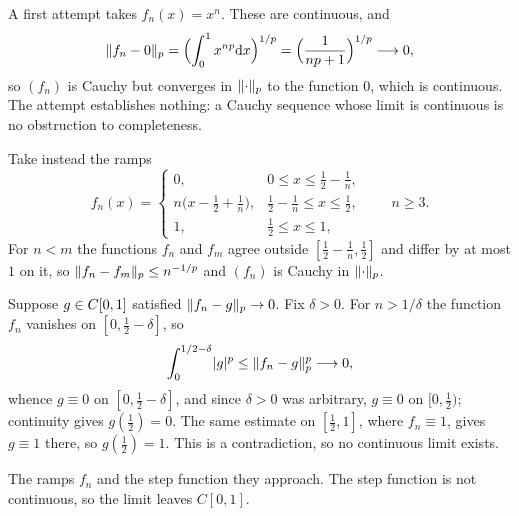 \begin{solution}[Discussion]
A first attempt takes $f_n(x) = x^n$. These are continuous, and
\[
  \lVert f_n - 0\rVert_p = \Bigl(\int_0^1 x^{np} \mathrm{d} x\Bigr)^{1/p}
  = \Bigl(\frac{1}{np+1}\Bigr)^{1/p} \longrightarrow 0 ,
\]
so $(f_n)$ is Cauchy but converges in $\lVert\cdot\rVert_p$ to the function $0$,
which is continuous. The attempt establishes nothing: a Cauchy sequence whose
limit is continuous is no obstruction to completeness.

Take instead the ramps
\[
  f_n(x) =
  \begin{cases}
    0, & 0 \le x \le \tfrac{1}{2} - \tfrac{1}{n}, \\[2pt]
    n\bigl(x - \tfrac{1}{2} + \tfrac{1}{n}\bigr),
      & \tfrac{1}{2} - \tfrac{1}{n} \le x \le \tfrac{1}{2}, \\[2pt]
    1, & \tfrac{1}{2} \le x \le 1,
  \end{cases}
  \qquad n \ge 3 .
\]
For $n < m$ the functions $f_n$ and $f_m$ agree outside
$[\frac{1}{2} - \frac{1}{n}, \frac{1}{2}]$ and differ by at most $1$ on it, so
$\lVert f_n - f_m\rVert_p \le n^{-1/p}$ and $(f_n)$ is Cauchy in
$\lVert\cdot\rVert_p$.

Suppose $g \in C[0,1]$ satisfied $\lVert f_n - g\rVert_p \to 0$. Fix
$\delta > 0$. For $n > 1/\delta$ the function $f_n$ vanishes on
$[0, \frac{1}{2} - \delta]$, so
\[
  \int_0^{1/2-\delta} \lvert g\rvert^p \le \lVert f_n - g\rVert_p^p \longrightarrow 0,
\]
whence $g \equiv 0$ on $[0, \frac{1}{2} - \delta]$, and since $\delta > 0$ was
arbitrary, $g \equiv 0$ on $[0, \frac{1}{2})$; continuity gives
$g(\frac{1}{2}) = 0$. The same estimate on $[\frac{1}{2}, 1]$, where
$f_n \equiv 1$, gives $g \equiv 1$ there, so $g(\frac{1}{2}) = 1$. This is a
contradiction, so no continuous limit exists.
\end{solution}

\begin{nfigure}{The ramps $f_n$ and the step function they approach. The step
function is not continuous, so the limit leaves $C[0,1]$.}
\end{nfigure}

